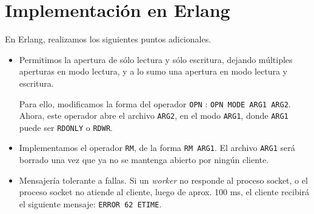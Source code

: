 \documentclass[a4paper, 8pt]{article}
\begin{document}
\begin{enumerate}
    
    
    
    
  \end{enumerate}


\section{Implementación en Erlang}

En Erlang, realizamos los siguientes puntos adicionales.

\begin{itemize}
  \item Permitimos la apertura de sólo lectura y sólo escritura, dejando múltiples aperturas en modo lectura, y a lo sumo
  una apertura en modo lectura y escritura.
  
  Para ello, modificamos la forma del operador \texttt{OPN} :
  \texttt{OPN MODE ARG1 ARG2}. Ahora, este operador abre el archivo \texttt{ARG2}, en el modo \texttt{ARG1},
  donde \texttt{ARG1} puede ser \texttt{RDONLY} o \texttt{RDWR}.
  
  \item Implementamos el operador \texttt{RM}, de la forma
  \texttt{RM ARG1}. El archivo \texttt{ARG1} será borrado una vez que ya no se mantenga abierto por ningún cliente.
  
  \item Mensajería tolerante a fallas. Si un \textit{worker} no responde al proceso socket, o el proceso socket no atiende
  al cliente, luego de aprox. 100 ms, el cliente recibirá el siguiente mensaje: \texttt{ERROR 62 ETIME}.
 
\end{itemize}
\end{document}
